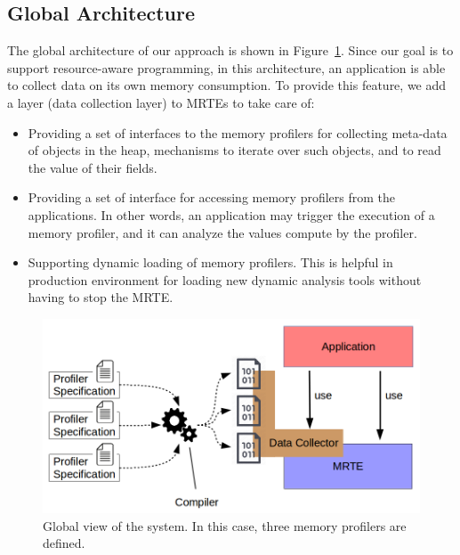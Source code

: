 

\subsection{Global Architecture}\label{sec:dsl-global-architecture}

The global architecture of our approach is shown in Figure~\ref{fig:dsl-global-view}.
Since our goal is to support resource-aware programming, in this architecture, an application is able to collect data on its own memory consumption.
To provide this feature, we add a layer (data collection layer) to MRTEs to take care of: 

\begin{itemize}
\item Providing a set of interfaces to the memory profilers for collecting meta-data of objects in the heap, mechanisms to iterate over such objects, and to read the value of their fields.

\item Providing a set of interface for accessing memory profilers from the applications.
In other words, an application may trigger the execution of a memory profiler, and it can analyze the values compute by the profiler.

\item Supporting dynamic loading of memory profilers.
This is helpful in production environment for loading new dynamic analysis tools without having to stop the MRTE.
\end{itemize}

\begin{figure}[!ht]
\centering
\includegraphics[scale=0.4]{./chapter6/fig/global-view.png}
\caption{Global view of the system. In this case, three memory profilers are defined.}\label{fig:dsl-global-view}
\end{figure}

